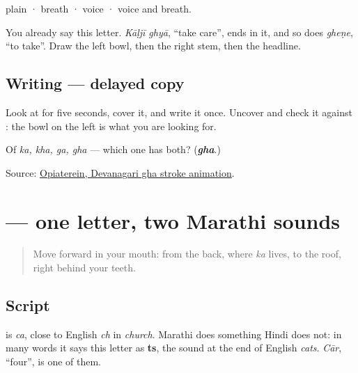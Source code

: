 \textbf{} plain · \textbf{} breath · \textbf{} voice · \textbf{} voice and breath.

You already say this letter. \emph{Kāḷjī ghyā}, \textquotedblleft{}take care\textquotedblright{}, ends in it, and so does \emph{gheṇe}, \textquotedblleft{}to take\textquotedblright{}. Draw the left bowl, then the right stem, then the headline.

\subsection*{Writing — delayed copy}

Look at \textbf{} for five seconds, cover it, and write it once. Uncover and check it against \textbf{}: the bowl on the left is what you are looking for.

\begin{tcolorbox}[breakable,colback=teal!4,colframe=teal!35!black,title={Before you move on}]
Of \emph{ka, kha, ga, gha} — which one has both? (\emph{\textbf{gha}}.)

Source: \href{https://commons.wikimedia.org/wiki/File:Deva-\%E0\%A4\%98-order.gif}{Opiaterein, Devanagari gha stroke animation}.
\end{tcolorbox}
\section[\texorpdfstring{\mr{च} (ca)}{च (ca)}]{ — one letter, two Marathi sounds}

\label{lesson:MR-W06-ca}



\begin{quote}
Move forward in your mouth: from the back, where \emph{ka} lives, to the roof, right behind your teeth.
\end{quote}

\subsection*{Script}
\begin{quote}
\end{quote}

\textbf{} is \emph{ca}, close to English \emph{ch} in \emph{church}. Marathi does something Hindi does not: in many words it says this letter as \textbf{ts}, the sound at the end of English \emph{cats}. \emph{Cār}, \textquotedblleft{}four\textquotedblright{}, is one of them.


